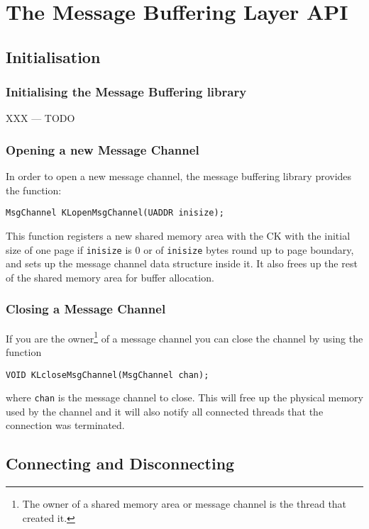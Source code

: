 \documentclass[]{article}
\begin{document}
\section{The Message Buffering Layer API}

\subsection{Initialisation}

\subsubsection{Initialising the Message Buffering library}

XXX --- TODO

\subsubsection{Opening a new Message Channel}

In order to open a new message channel, the message buffering library
provides the function:

{\parindent0.6cm\tt MsgChannel KLopenMsgChannel(UADDR inisize);}

This function registers a new shared memory area with the CK with the
initial size of one page if {\tt inisize} is 0 or of {\tt inisize}
bytes round up to page boundary, and sets up the message channel data
structure inside it.  It also frees up the rest of the shared memory area
for buffer allocation.

\subsubsection{Closing a Message Channel}

If you are the owner\footnote{The owner of a shared memory area or
message channel is the thread that created it.} of a message channel you
can close the channel by using the function

{\parindent0.6cm\tt VOID KLcloseMsgChannel(MsgChannel chan);}

where {\tt chan} is the message channel to close.  This will free up the
physical memory used by the channel and it will also notify all connected
threads that the connection was terminated.

\subsection{Connecting and Disconnecting}
\end{document}
